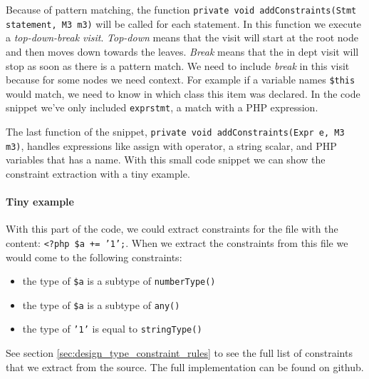 \documentclass[../main.tex]{subfiles}
\begin{document}
	Because of pattern matching, the function \texttt{private void addConstraints(Stmt statement, M3 m3)} will be called for each statement.
	In this function we execute a \textit{top-down-break visit}. \textit{Top-down} means that the visit will start at the root node and then moves down towards the leaves.
	\textit{Break} means that the in dept visit will stop as soon as there is a pattern match.
	We need to include \textit{break} in this visit because for some nodes we need context.
	For example if a variable names \texttt{\$this} would match, we need to know in which class this item was declared.
	In the code snippet we've only included \texttt{exprstmt}, a match with a PHP expression.
	
	The last function of the snippet, \texttt{private void addConstraints(Expr e, M3 m3)}, handles expressions like assign with operator, a string scalar, and PHP variables that has a name.
	With this small code snippet we can show the constraint extraction with a tiny example.
	
	\paragraph{Tiny example}
	With this part of the code, we could extract constraints for the file with the content: \texttt{<?php \$a += '1';}.
	When we extract the constraints from this file we would come to the following constraints:
	\begin{itemize}
		\item the type of \texttt{\$a} is a subtype of \texttt{numberType()}
		\item the type of \texttt{\$a} is a subtype of \texttt{any()}
		\item the type of \texttt{'1'} is equal to \texttt{stringType()}
	\end{itemize}
	See section \ref{sec:design_type_constraint_rules} to see the full list of constraints that we extract from the source.
	The full implementation can be found on github.
	
\end{document}
